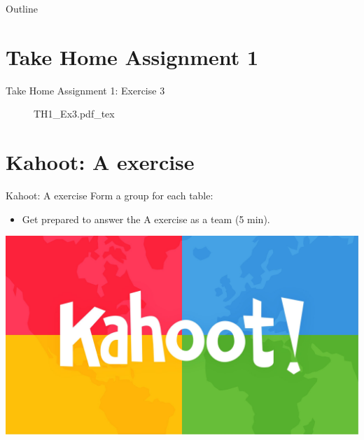 

\maketitle

\begin{frame}{Outline}
    \tableofcontents
\end{frame}


\section{Take Home Assignment 1}

\begin{frame}{Take Home Assignment 1: Exercise 3}
  \begin{figure}[!h]
    \begin{center}
    \def\svgwidth{1.0\columnwidth}
    {TH1_Ex3.pdf_tex}
    \end{center}
  \end{figure}
\end{frame}


\section{Kahoot: A exercise}

\begin{frame}{Kahoot: A exercise}
  Form a group for each table:
  \begin{itemize}
    \item Get prepared to answer the A exercise as a team (5 min).
  \end{itemize}
  \includegraphics[width=\textwidth]{figures/kahoot}
\end{frame}


